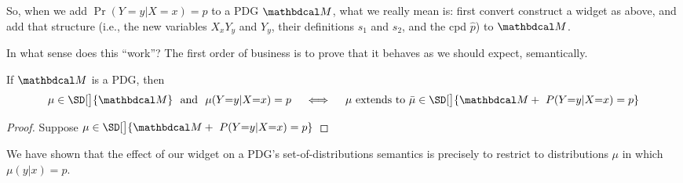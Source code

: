 So, when we add $\Pr(Y=y|X=x) = p$ to a PDG $\dg M$, what we really mean is:
first convert construct a widget as above, and add that structure (i.e., the new variables
$X_xY_y$ and $Y_y$, their definitions $s_1$ and $s_2$, and the cpd $\hat p$) to $\dg M$.

In what sense does this ``work''?
The first order of business
is to prove that it behaves as we should expect,
semantically.


\begin{prop}
    If $\dg M$ is a PDG, then 
    \[
    \mu \in \SD[\big]{\dg M} \text{~~and~~} \mu(Y{=}y|X{=}x) = p
    \quad\iff\quad
    \mu \text { extends to }
    \bar\mu \in \SD[\big]{\dg M + ~\Pr(Y{=}y|X{=}x) = p}
    \]
\end{prop}
\begin{proof}
    Suppose $\mu \in \SD[\big]{\dg M + ~\Pr(Y{=}y|X{=}x) = p}$
\end{proof}

We have shown that the effect of our widget on a PDG's set-of-distributions semantics is precisely to restrict to distributions $\mu$ in which $\mu(y|x) = p$. 

